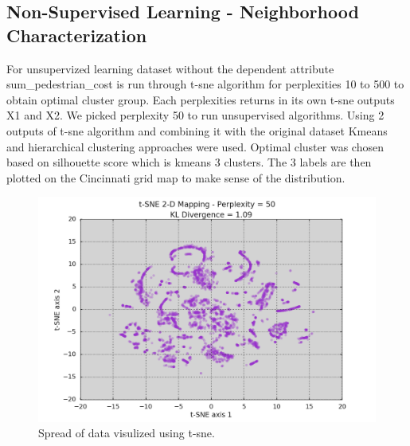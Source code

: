 \documentclass{llncs}
\begin{document}
\subsection{Non-Supervised Learning - Neighborhood Characterization}

For unsupervized learning dataset without the dependent attribute sum_pedestrian_cost is run through t-sne algorithm for perplexities 10 to 500 to obtain optimal cluster group. Each perplexities returns in its own t-sne outputs X1 and X2. We picked perplexity 50 to run unsupervised algorithms. 
Using 2 outputs of t-sne algorithm and combining it with the original dataset Kmeans and hierarchical clustering approaches were used.  Optimal cluster was chosen based on silhouette score which is kmeans 3 clusters.  The 3 labels are then plotted on the Cincinnati grid map to make sense of the distribution. 

\FloatBarrier
\begin{figure}
 	\includegraphics[width=\textwidth, height=\textheight, keepaspectratio]{perplexity.png}
 	\caption{Spread of data visulized using t-sne.}
	\label{figure:perplexity}

\end{figure}
\FloatBarrier
\end{document}
